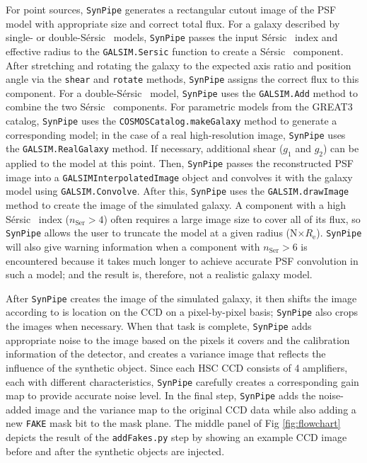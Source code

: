 \documentclass[useamsfonts]{pasj01}
\def\ser{{S\'{e}rsic\ }}
\def\synpipe{\texttt{SynPipe}}
\def\galsim{\texttt{G}{\scriptsize \texttt{AL}}\texttt{S}{\scriptsize \texttt{IM}}}
\begin{document}
    For point sources, \synpipe{} generates a rectangular cutout image of the PSF model
    with appropriate size and correct total flux.
    For a galaxy described by single- or double-\ser{} models, \synpipe{} passes the 
    input \ser{} index and effective radius to the \galsim{}\texttt{.Sersic} function to
    create a \ser{} component.
    After stretching and rotating the galaxy to the expected axis ratio and position 
    angle via the \texttt{shear} and \texttt{rotate} methods, \synpipe{} assigns the 
    correct flux to this component.
    For a double-\ser{} model, \synpipe{} uses the \galsim{}\texttt{.Add} method to 
    combine the two \ser{} components.
    For parametric models from the GREAT3 catalog, \synpipe{} uses the
    \texttt{COSMOSCatalog.makeGalaxy} method to generate a corresponding model; in the 
    case of a real high-resolution image, \synpipe{} uses the 
    \galsim{}\texttt{.RealGalaxy} method.
    If necessary, additional shear ($g_1$ and $g_2$) can be applied to the model at 
    this point.
    Then, \synpipe{} passes the reconstructed PSF image into a
    \galsim{}\texttt{InterpolatedImage} object and convolves it with the galaxy model
    using \galsim{}\texttt{.Convolve}.
    After this, \synpipe{} uses the \galsim{}\texttt{.drawImage} method to create the 
    image of the simulated galaxy.
    A component with a high \ser{} index ($n_{\mathrm{Ser}} > 4$) often requires a 
    large image size to cover all of its flux, so \synpipe{} allows the user to 
    truncate the model at a given radius (N$\times R_{\mathrm{e}}$).
    \synpipe{} will also give warning information when a component with $
    n_{\mathrm{Ser}} > 6$ is encountered because it takes much longer to achieve 
    accurate PSF convolution in such a model; and the result is, therefore,  
    not a realistic galaxy model.

    After \synpipe{} creates the image of the simulated galaxy, it then shifts the 
    image according to is location on the CCD on a pixel-by-pixel basis; 
    \synpipe{} also crops the images when necessary.
    When that task is complete, \synpipe{} adds appropriate noise to the image based 
    on the pixels it covers and the calibration information of the detector, and creates 
    a variance image that reflects the influence of the synthetic object.
    Since each HSC CCD consists of 4 amplifiers, each with different characteristics,
    \synpipe{} carefully creates a corresponding gain map to provide accurate noise 
    level.
    In the final step, \synpipe{} adds the noise-added image and the variance map to the
    original CCD data while also adding a new \texttt{FAKE} mask bit to the mask plane.
    The middle panel of Fig \ref{fig:flowchart} depicts the result of the
    \texttt{addFakes.py} step by showing an example CCD image before and after the
    synthetic objects are injected.
\end{document}
